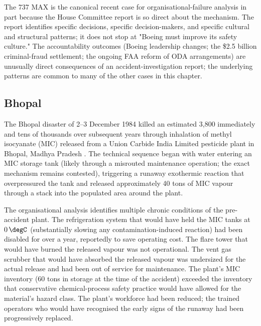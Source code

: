 The 737 MAX is the canonical recent case for organisational-failure analysis in part because the House Committee report is so direct about the mechanism. The report identifies specific decisions, specific decision-makers, and specific cultural and structural patterns; it does not stop at "Boeing must improve its safety culture." The accountability outcomes (Boeing leadership changes; the \$2.5 billion criminal-fraud settlement; the ongoing FAA reform of ODA arrangements) are unusually direct consequences of an accident-investigation report; the underlying patterns are common to many of the other cases in this chapter.

\subsection*{Bhopal}

The Bhopal disaster of 2--3 December 1984 killed an estimated 3,800 immediately and tens of thousands over subsequent years through inhalation of methyl isocyanate (MIC) released from a Union Carbide India Limited pesticide plant in Bhopal, Madhya Pradesh \cite{acc:icmr-bhopal-2004}. The technical sequence began with water entering an MIC storage tank (likely through a misrouted maintenance operation; the exact mechanism remains contested), triggering a runaway exothermic reaction that overpressured the tank and released approximately 40 tons of MIC vapour through a stack into the populated area around the plant.

The organisational analysis identifies multiple chronic conditions of the pre-accident plant. The refrigeration system that would have held the MIC tanks at $0\,\degC$ (substantially slowing any contamination-induced reaction) had been disabled for over a year, reportedly to save operating cost. The flare tower that would have burned the released vapour was not operational. The vent gas scrubber that would have absorbed the released vapour was undersized for the actual release and had been out of service for maintenance. The plant's MIC inventory (60 tons in storage at the time of the accident) exceeded the inventory that conservative chemical-process safety practice would have allowed for the material's hazard class. The plant's workforce had been reduced; the trained operators who would have recognised the early signs of the runaway had been progressively replaced.

